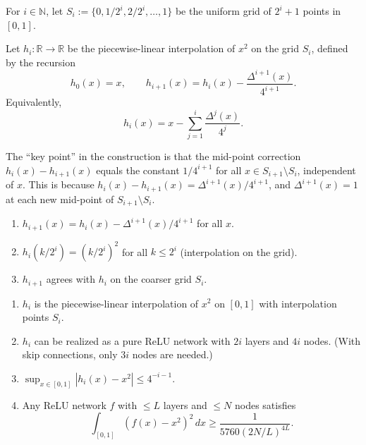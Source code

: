 \begin{definition}\label{def:squareInterpGrid}
For $i \in \mathbb{N}$, let $S_i := \{0, 1/2^i, 2/2^i, \ldots, 1\}$ be the uniform grid
of $2^i+1$ points in $[0,1]$.
\end{definition}

\begin{definition}\label{def:squareInterp}
Let $h_i : \mathbb{R} \to \mathbb{R}$ be the piecewise-linear interpolation of $x^2$
on the grid $S_i$, defined by the recursion
\[
  h_0(x) = x, \qquad h_{i+1}(x) = h_i(x) - \frac{\Delta^{i+1}(x)}{4^{i+1}}.
\]
Equivalently,
\[
  h_i(x) = x - \sum_{j=1}^{i} \frac{\Delta^j(x)}{4^j}.
\]
\end{definition}

\begin{remark}
  The ``key point'' in the construction is that the mid-point correction
  $h_i(x) - h_{i+1}(x)$ equals the constant $1/4^{i+1}$ for all $x \in S_{i+1} \setminus S_i$,
  independent of $x$.
  This is because $h_i(x) - h_{i+1}(x) = \Delta^{i+1}(x)/4^{i+1}$, and
  $\Delta^{i+1}(x) = 1$ at each new mid-point of $S_{i+1} \setminus S_i$.
\end{remark}

\begin{lemma}\label{lem:squareInterp_recursion}
\begin{enumerate}
  \item $h_{i+1}(x) = h_i(x) - \Delta^{i+1}(x)/4^{i+1}$ for all $x$.
  \item $h_i(k/2^i) = (k/2^i)^2$ for all $k \leq 2^i$ (interpolation on the grid).
  \item $h_{i+1}$ agrees with $h_i$ on the coarser grid $S_i$.
\end{enumerate}
\end{lemma}

\begin{theorem}\label{thm:squareApprox}
\begin{enumerate}
  \item $h_i$ is the piecewise-linear interpolation of $x^2$ on $[0,1]$ with interpolation
    points $S_i$.
  \item $h_i$ can be realized as a pure ReLU network with $2i$ layers and $4i$ nodes.
    (With skip connections, only $3i$ nodes are needed.)
  \item $\sup_{x \in [0,1]} |h_i(x) - x^2| \leq 4^{-i-1}$.
  \item Any ReLU network $f$ with $\leq L$ layers and $\leq N$ nodes satisfies
    \[
      \int_{[0,1]} (f(x) - x^2)^2 \, dx \geq \frac{1}{5760 (2N/L)^{4L}}.
    \]
\end{enumerate}
\end{theorem}

